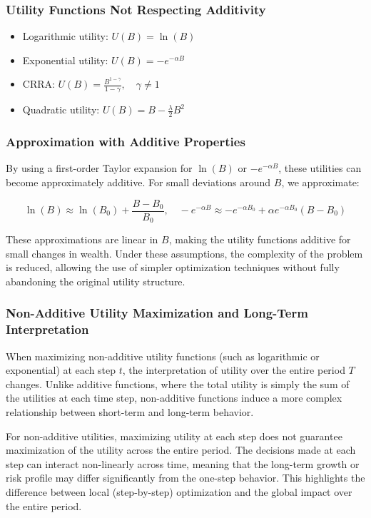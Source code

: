 \subsubsection{Utility Functions Not Respecting Additivity}
\begin{itemize}
\item Logarithmic utility: \( U(B) = \ln(B) \)
\item Exponential utility: \( U(B) = -e^{-\alpha B} \)
\item CRRA: \(U(B) = \frac{B^{1 - \gamma}}{1 - \gamma}, \quad \gamma \neq 1\)
\item Quadratic utility: \(U(B) = B - \frac{\lambda}{2} B^2\)
\end{itemize}

\subsubsection{Approximation with Additive Properties}
By using a first-order Taylor expansion for \( \ln(B) \) or \( -e^{-\alpha B} \), these utilities can become approximately additive. For small deviations around \( B \), we approximate:

\[
\ln(B) \approx \ln(B_0) + \frac{B - B_0}{B_0}, \quad -e^{-\alpha B} \approx -e^{-\alpha B_0} + \alpha e^{-\alpha B_0} (B - B_0)
\]

These approximations are linear in \( B \), making the utility functions additive for small changes in wealth. Under these assumptions, the complexity of the problem is reduced, allowing the use of simpler optimization techniques without fully abandoning the original utility structure.

\subsubsection{Non-Additive Utility Maximization and Long-Term Interpretation}

When maximizing non-additive utility functions (such as logarithmic or exponential) at each step \( t \), the interpretation of utility over the entire period \( T \) changes. Unlike additive functions, where the total utility is simply the sum of the utilities at each time step, non-additive functions induce a more complex relationship between short-term and long-term behavior.

For non-additive utilities, maximizing utility at each step does not guarantee maximization of the utility across the entire period. The decisions made at each step can interact non-linearly across time, meaning that the long-term growth or risk profile may differ significantly from the one-step behavior. This highlights the difference between local (step-by-step) optimization and the global impact over the entire period.

